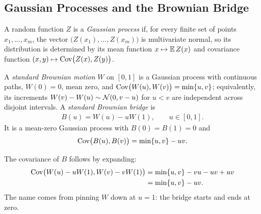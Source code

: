 \documentclass[a4paper,12pt]{article}
\begin{document}
%

\subsection{Gaussian Processes and the Brownian Bridge}

\begin{definition}
	A random function $Z$ is a \emph{Gaussian process} if, for every finite set of points $x_1,...,x_m$,
	the vector $\bigl(Z(x_1),...,Z(x_m)\bigr)$ is multivariate normal,
	so its distribution is determined by its mean function $x\mapsto\operatorname{\mathbb{E}} Z(x)$ and covariance function $(x,y)\mapsto\operatorname{\text{\textrm{\upshape{Cov}}}}\bigl(Z(x),Z(y)\bigr)$.
\end{definition}

\begin{definition}
	A \emph{standard Brownian motion} $W$ on $[0,1]$ is a Gaussian process with continuous paths,
	$W(0)=0$, mean zero, and $\operatorname{\text{\textrm{\upshape{Cov}}}}\bigl(W(u),W(v)\bigr)=\min\{u,v\}$;
	equivalently, its increments $W(v)-W(u)\sim\operatorname{\mathcal{N}}(0,v-u)$ for $u<v$ are independent across disjoint intervals.
	A \emph{standard Brownian bridge} is
	\begin{align}
		B(u)=W(u)-uW(1),
		\qquad u\in[0,1].
	\end{align}
	It is a mean-zero Gaussian process with $B(0)=B(1)=0$ and
	\begin{align}
		\operatorname{\text{\textrm{\upshape{Cov}}}}\bigl(B(u),B(v)\bigr)=\min\{u,v\}-uv.
	\end{align}
\end{definition}

\begin{remark}[Bridge]
	The covariance of $B$ follows by expanding:
	\begin{align*}
		\operatorname{\text{\textrm{\upshape{Cov}}}}\bigl(W(u)-uW(1),W(v)-vW(1)\bigr)
		&= \min\{u,v\}-vu-uv+uv \\
		&= \min\{u,v\}-uv.
	\end{align*}
	The name comes from pinning $W$ down at $u=1$: the bridge starts and ends at zero.
\end{remark}
\end{document}

